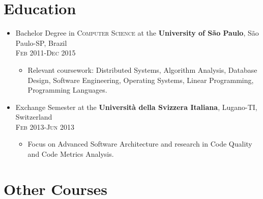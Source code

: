 
\section{Education}

\begin{itemize}
    \item \footnotesize{Bachelor Degree in \textsc{Computer Science} at the \textbf{University of São Paulo}, São Paulo-SP, Brazil}\\
    \textsc{\scriptsize{Feb 2011-Dec 2015}}
    \begin{itemize}
        \item \scriptsize{Relevant coursework: Distributed Systems, Algorithm Analysis, Database Design, Software Engineering, Operating Systems, Linear Programming, Programming Languages.}
    \end{itemize}

    \item \footnotesize{Exchange Semester at the \textbf{Università della Svizzera Italiana}, Lugano-TI, Switzerland}\\
    \textsc{\scriptsize{Feb 2013-Jun 2013}}
    \begin{itemize}
        \item \scriptsize{Focus on Advanced Software Architecture and research in Code Quality and Code Metrics Analysis.}
    \end{itemize}
\end{itemize}

\section{Other Courses}

